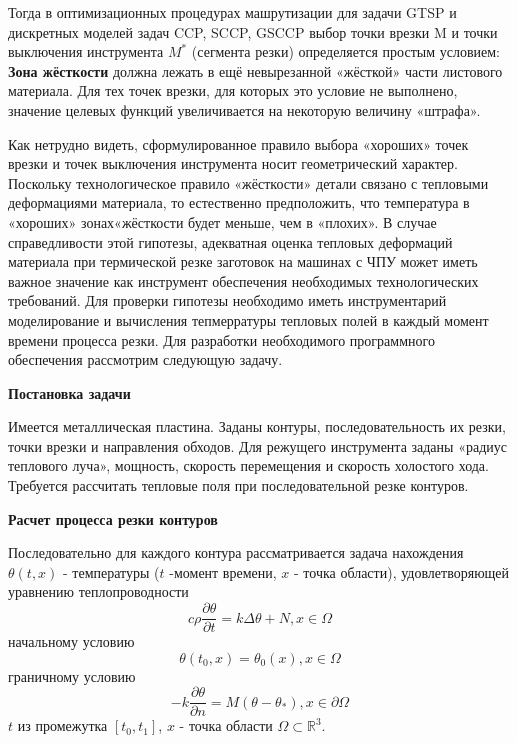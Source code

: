 \documentclass{article}
\begin{document}
Тогда в оптимизационных процедурах машрутизации
для задачи GTSP  и дискретных моделей задач CCP, SCCP, GSCCP
выбор точки врезки M и точки выключения инструмента $M^*$
(сегмента резки) определяется простым условием:
{\bf Зона жёсткости} должна лежать в ещё невырезанной
«жёсткой» части листового материала.
Для тех точек врезки, для которых это условие не выполнено,
значение целевых функций  увеличивается на некоторую величину «штрафа».

Как нетрудно видеть,
сформулированное правило выбора «хороших» точек врезки
и точек выключения инструмента носит геометрический характер.
Поскольку технологическое правило «жёсткости» детали
связано с тепловыми деформациями материала,
то естественно предположить,
что температура в «хороших» зонах«жёсткости будет меньше,
чем в «плохих».
В случае справедливости этой гипотезы,
адекватная оценка тепловых деформаций материала
при термической резке заготовок на машинах с ЧПУ
может иметь важное значение как инструмент
обеспечения необходимых технологических требований.
Для проверки гипотезы необходимо иметь инструментарий
моделирование и вычисления тепмерратуры тепловых полей в
каждый момент времени процесса резки.
Для разработки необходимого программного
обеспечения рассмотрим следующую задачу.

{\bf Постановка задачи}

Имеется металлическая пластина.
Заданы контуры, последовательность их резки,
точки врезки и направления обходов.
Для режущего инструмента заданы «радиус теплового луча»,
мощность, скорость перемещения и скорость холостого хода.
Требуется рассчитать тепловые поля при
последовательной резке контуров.

{\bf Расчет процесса резки контуров}

Последовательно для каждого контура рассматривается задача нахождения
$\theta(t, x)$ - температуры
($t$ -момент времени,
$x$ - точка области), удовлетворяющей уравнению теплопроводности
\begin{equation}
c \rho \frac{\partial \theta}{\partial t}=k \Delta \theta +N, x \in \Omega
\end{equation}
начальному условию
\begin{equation}
  \theta(t_0, x)=\theta_0(x), x \in \Omega
\end{equation}
граничному условию
\begin{equation}
  -k \frac{\partial \theta}{\partial n}=M(\theta - \theta_*), x \in \partial \Omega
\end{equation}
$t$ из промежутка $[t_0, t_1]$,
$x$ - точка области
$\Omega \subset \mathbb R^3$.
\end{document}
